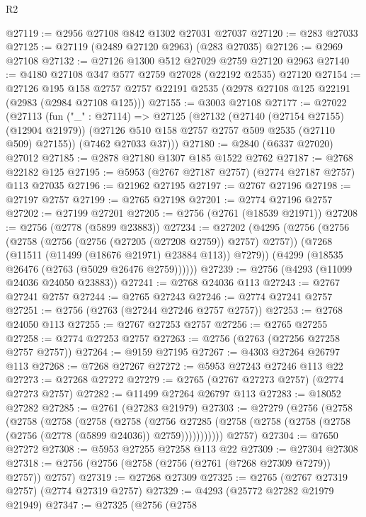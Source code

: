 \begin{lexlean}{R2}
\begin{coremodule}
@27119 := @2956 @27108 @842 @1302 @27031 @27037
@27120 := @283 @27033
@27125 := @27119 (@2489 @27120 @2963) (@283 @27035)
@27126 := @2969 @27108
@27132 := @27126 @1300 @512 @27029 @2759 @27120 @2963
@27140 := @4180 @27108 @347 @577 @2759 @27028 (@22192 @2535) @27120
@27154 := @27126
    @195
    @158
    @2757
    @2757
    @22191
    @2535
    (@2978 @27108 @125 @22191 (@2983 (@2984 @27108 @125)))
@27155 := @3003 @27108
@27177 := @27022
    (@27113
      (fun ("_" : @27114) =>
      @27125
        (@27132
          (@27140 (@27154 @27155) (@12904 @21979))
          (@27126 @510 @158 @2757 @2757 @509 @2535 (@27110 @509) @27155))
        (@7462 @27033 @37)))
@27180 := @2840 (@6337 @27020) @27012
@27185 := @2878 @27180 @1307 @185 @1522 @2762
@27187 := @2768 @22182 @125
@27195 := @5953 (@2767 @27187 @2757) (@2774 @27187 @2757) @113 @27035
@27196 := @21962 @27195
@27197 := @2767 @27196
@27198 := @27197 @2757
@27199 := @2765 @27198
@27201 := @2774 @27196 @2757
@27202 := @27199 @27201
@27205 := @2756 (@2761 (@18539 @21971))
@27208 := @2756 (@2778 (@5899 @23883))
@27234 := @27202
    (@4295
      (@2756
        (@2756
          (@2758 (@2756 (@2756 (@27205 (@27208 @2759)) @2757) @2757))
          (@7268 (@11511 (@11499 (@18676 @21971) @23884 @113)) @7279))
        (@4299 (@18535 @26476 (@2763 (@5029 @26476 @2759))))))
@27239 := @2756 (@4293 (@11099 @24036 @24050 @23883))
@27241 := @2768 @24036 @113
@27243 := @2767 @27241 @2757
@27244 := @2765 @27243
@27246 := @2774 @27241 @2757
@27251 := @2756 (@2763 (@27244 @27246 @2757 @2757))
@27253 := @2768 @24050 @113
@27255 := @2767 @27253 @2757
@27256 := @2765 @27255
@27258 := @2774 @27253 @2757
@27263 := @2756 (@2763 (@27256 @27258 @2757 @2757))
@27264 := @9159 @27195
@27267 := @4303 @27264 @26797 @113
@27268 := @7268 @27267
@27272 := @5953 @27243 @27246 @113 @22
@27273 := @27268 @27272
@27279 := @2765 (@2767 @27273 @2757) (@2774 @27273 @2757)
@27282 := @11499 @27264 @26797 @113
@27283 := @18052 @27282
@27285 := @2761 (@27283 @21979)
@27303 := @27279
    (@2756
      (@2758
        (@2758
          (@2758
            (@2758
              (@2758
                (@2756
                  @27285
                  (@2758 (@2758 (@2758 (@2758 (@2756 (@2778 (@5899 @24036)) @2759)))))))))))
      @2757)
@27304 := @7650 @27272
@27308 := @5953 @27255 @27258 @113 @22
@27309 := @27304 @27308
@27318 := @2756 (@2756 (@2758 (@2756 (@2761 (@7268 @27309 @7279)) @2757)) @2757)
@27319 := @27268 @27309
@27325 := @2765 (@2767 @27319 @2757) (@2774 @27319 @2757)
@27329 := @4293 (@25772 @27282 @21979 @21949)
@27347 := @27325
    (@2756
      (@2758

\end{coremodule}
\end{lexlean}
